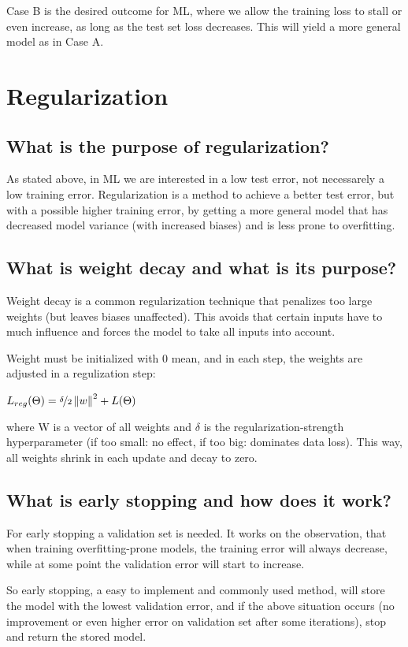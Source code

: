Case B is the desired outcome for ML, where we allow the training loss to stall or even increase, as long as the test set loss decreases. This will yield a more general model as in Case A.

\section{Regularization}
\subsection{What is the purpose of regularization?}

As stated above, in ML we are interested in a low test error, not necessarely a low training error. Regularization is a method to achieve a better test error, but with a possible higher training error, by getting a more general model that has decreased model variance (with increased biases) and is less prone to overfitting. 

\subsection{What is weight decay and what is its purpose?}
Weight decay is a common regularization technique that penalizes too large weights (but leaves biases unaffected). This avoids that certain inputs have to much influence and forces the model to take all inputs into account. 

Weight must be initialized with 0 mean, and in each step, the weights are adjusted in a regulization step:

$L_{reg}(\Theta) = \nicefrac{\delta}{2}\left\lVert w\right\rVert^2 + L(\Theta)$

where W is a vector of all weights and $\delta$ is the regularization-strength hyperparameter (if too small: no effect, if too big: dominates data loss).
This way, all weights shrink in each update and decay to zero.  

\subsection{What is early stopping and how does it work?}
For early stopping a validation set is needed. It works on the observation, that when training overfitting-prone models, the training error will always decrease, while at some point the validation error will start to increase. 

So early stopping, a easy to implement and commonly used method, will store the model with the lowest validation error, and if the above situation occurs (no improvement or even higher error on validation set after some iterations), stop and return the stored model.

